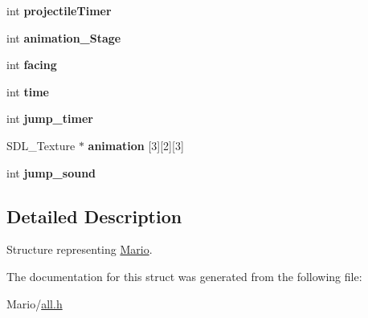 \begin{DoxyCompactItemize}
int {\bfseries projectile\+Timer}
\item 
\mbox{\label{struct_mario_a6118bdc05fce34a198c8e8d332708235}} 
int {\bfseries animation\+\_\+\+Stage}
\item 
\mbox{\label{struct_mario_a0649f2bc6181d3fe471c7a9d9ab7b8a4}} 
int {\bfseries facing}
\item 
\mbox{\label{struct_mario_a42715f65f02da52edc5b22021d8ae670}} 
int {\bfseries time}
\item 
\mbox{\label{struct_mario_aaf3f00ff9477068539944f444e74f1eb}} 
int {\bfseries jump\+\_\+timer}
\item 
\mbox{\label{struct_mario_aab93ef810c46274d5eb4cd4046a5870a}} 
S\+D\+L\+\_\+\+Texture $\ast$ {\bfseries animation} \mbox{[}3\mbox{]}\mbox{[}2\mbox{]}\mbox{[}3\mbox{]}
\item 
\mbox{\label{struct_mario_a86b6e1d1d870183ed13e9ebc5a0a8bbc}} 
int {\bfseries jump\+\_\+sound}
\end{DoxyCompactItemize}


\subsection{Detailed Description}
Structure representing \mbox{\hyperlink{struct_mario}{Mario}}. 

The documentation for this struct was generated from the following file\+:\begin{DoxyCompactItemize}
\item 
Mario/\mbox{\hyperlink{all_8h}{all.\+h}}\end{DoxyCompactItemize}
